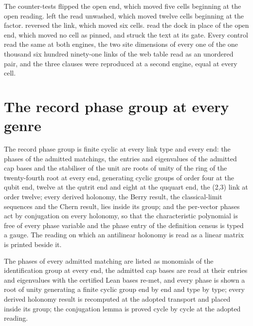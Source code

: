 \begin{chproof}[census]
The counter-tests flipped the open end, which moved five cells beginning at the open reading. left the read unwashed, which moved twelve cells beginning at the factor. reversed the link, which moved six cells. read the dock in place of the open end, which moved no cell as pinned, and struck the text at its gate. Every control read the same at both engines, the two site dimensions of every one of the one thousand six hundred ninety-one links of the web table read as an unordered pair, and the three clauses were reproduced at a second engine, equal at every cell.
\end{chproof}
\section{The record phase group at every genre}\label{mod:I-2-D535680-rphg-t1}
\begin{chtheorem}\label{box:I-2-D535680-rphg-t1:1}
The record phase group is finite cyclic at every link type and every end: the phases of the admitted matchings, the entries and eigenvalues of the admitted cap bases and the stabiliser of the unit are roots of unity of the ring of the twenty-fourth root at every end, generating cyclic groups of order four at the qubit end, twelve at the qutrit end and eight at the ququart end, the (2,3) link at order twelve; every derived holonomy, the Berry result, the classical-limit sequences and the Chern result, lies inside its group; and the per-vector phases act by conjugation on every holonomy, so that the characteristic polynomial is free of every phase variable and the phase entry of the definition census is typed a gauge. The reading on which an antilinear holonomy is read as a linear matrix is printed beside it.
\end{chtheorem}
The phases of every admitted matching are listed as monomials of the identification group at every end, the admitted cap bases are read at their entries and eigenvalues with the certified Lean bases re-met, and every phase is shown a root of unity generating a finite cyclic group end by end and type by type; every derived holonomy result is recomputed at the adopted transport and placed inside its group; the conjugation lemma is proved cycle by cycle at the adopted reading.

